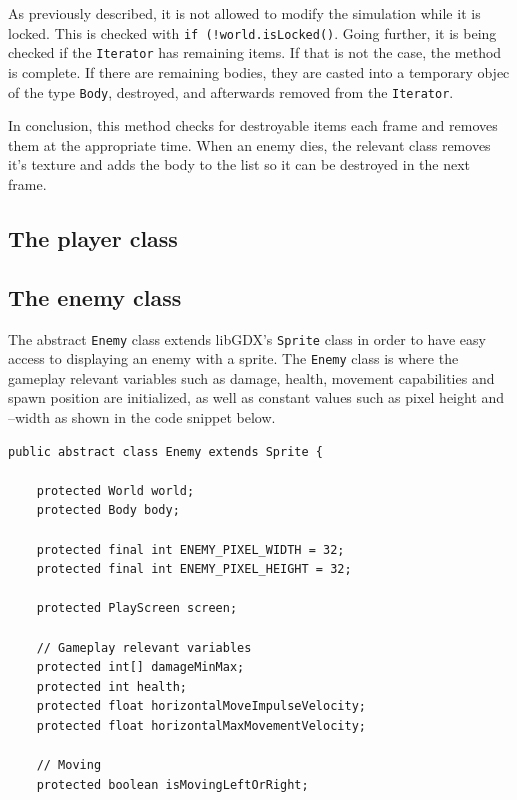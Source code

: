 \documentclass[12p]{article}
\begin{document}
As previously described, it is not allowed to modify the simulation while it is locked. This is checked with \texttt{if (!world.isLocked()}. Going further, it is being checked if the \texttt{Iterator} has remaining items. If that is not the case, the method is complete. If there are remaining bodies, they are casted into a temporary objec of the type \texttt{Body}, destroyed, and afterwards removed from the \texttt{Iterator}.

In conclusion, this method checks for destroyable items each frame and removes them at the appropriate time. When an enemy dies, the relevant class removes it's texture and adds the body to the list so it can be destroyed in the next frame.


\newpage
\subsection{The player class} \label{DocPlayerClass}


\newpage
\subsection{The enemy class} \label{DocEnemyClass}

The abstract \texttt{Enemy} class extends libGDX's \texttt{Sprite} class in order to have easy access to displaying an enemy with a sprite. The \texttt{Enemy} class is where the gameplay relevant variables such as damage, health, movement capabilities and spawn position are initialized, as well as constant values such as pixel height and –width as shown in the code snippet below. 

\begin{verbatim}
public abstract class Enemy extends Sprite {

    protected World world;
    protected Body body;

    protected final int ENEMY_PIXEL_WIDTH = 32;
    protected final int ENEMY_PIXEL_HEIGHT = 32;

    protected PlayScreen screen;

    // Gameplay relevant variables
    protected int[] damageMinMax;
    protected int health;
    protected float horizontalMoveImpulseVelocity;
    protected float horizontalMaxMovementVelocity;

    // Moving
    protected boolean isMovingLeftOrRight;
\end{verbatim}
\end{document}

